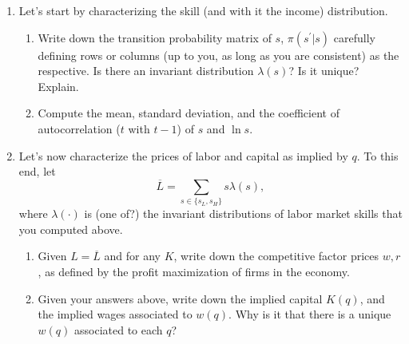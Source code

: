 \documentclass{article}
\begin{document}
\begin{enumerate}
    \item Let's start by characterizing the skill (and with it the income) distribution.
    \begin{enumerate}
        \item Write down the transition probability matrix of $s$, $\pi(s^{\prime}|s)$ carefully defining rows or columns (up to you, as long as you are consistent) as the respective. Is there an invariant distribution $\lambda(s)$? Is it unique? Explain.
        \item Compute the mean, standard deviation, and the coefficient of autocorrelation ($t$ with $t-1$) of $s$ and $\ln s$.
    \end{enumerate}

    \item Let's now characterize the prices of labor and capital as implied by $q$. To this end, let
    \begin{equation*}
    \overline{L}=\sum_{s\in\{s_{L},s_{H}\}}s\lambda(s),
    \end{equation*}
    where $\lambda(\cdot)$ is (one of?) the invariant distributions of labor market skills that you computed above.
    \begin{enumerate}
        \item Given $L=\overline{L}$ and for any $K$, write down the competitive factor prices $w, r$, as defined by the profit maximization of firms in the economy.
        \item Given your answers above, write down the implied capital $K(q)$, and the implied wages associated to $w(q)$. Why is it that there is a unique $w(q)$ associated to each $q$?
    \end{enumerate}


\end{enumerate}
\end{document}
